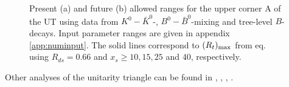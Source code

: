 \begin{figure}[hbt]
\vspace{0.10in}
\centerline{
\epsfysize=5in
 }
\vspace{0.08in}
\caption[]{
Present (a) and future (b) allowed ranges for the upper corner A
of the UT using data from $K^0-\bar K^0$-, $B^0-\bar B^0$-mixing
and tree-level $B$-decays. Input parameter ranges are given in appendix
\ref{app:numinput}.
The solid lines correspond to $(R_t)_{\rm max}$ from eq.
using $R_{ds}=0.66$ and $x_s \ge 10, 15, 25$ and $40$, respectively.
\label{fig:ut:rhoeta}}
\end{figure}

Other analyses of the unitarity triangle can be found in
\cite{pecceiwang:95}, \cite{ciuchini:95}, \cite{herrlichnierste:95},
\cite{alilondon:95}.
